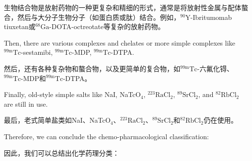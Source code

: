 \documentclass[dvipsnames, svgnames,a4paper,11pt]{article}
\begin{document}
生物结合物是放射药物的一种更复杂和精细的形式，通常是将放射性金属与配体螯合，然后与大分子生物分子（如蛋白质或肽）结合。例如，${}^\text{90}\text{Y}$-Ibritumomab tiuxetan或${}^\text{68}\text{Ga}$-DOTA-octreotate等复杂的放射药物。


Then, there are various complexes and chelates or more simple complexes like \(\mathrm{^{99m}Tc}\)-sestamibi, \(\mathrm{^{99m}Tc}\)-MDP, \(\mathrm{^{99m}Tc}\)-DTPA.  

然后，还有各种复杂物和螯合物，以及更简单的复合物，如${}^\text{99m}\text{Tc}$-六氟化锝、${}^\text{99m}\text{Tc}$-MDP和${}^\text{99m}\text{Tc}$-DTPA。

Finally, old-style simple salts like NaI, NaTcO\(_4\), \(\mathrm{^{223}Ra}\)Cl\(_2\), \(\mathrm{^{89}Sr}\)Cl\(_2\), and \(\mathrm{^{82}Rb}\)Cl\(_2\) are still in use.  

最后，老式简单盐类如NaI、NaTcO\(_4\)、${}^\text{223}\text{RaCl}_2$、${}^\text{89}\text{SrCl}_2$和${}^\text{82}\text{RbCl}_2$仍在使用。

Therefore, we can conclude the chemo-pharmacological classification:

因此，我们可以总结出化学药理分类：
\end{document}
